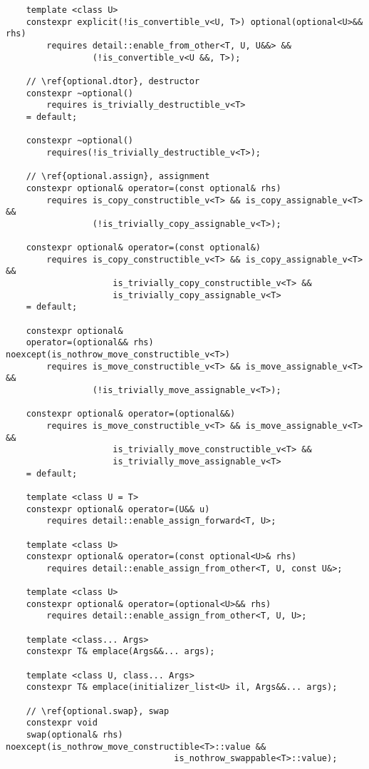 \documentclass[a4paper,10pt,oneside,openany,final,article]{memoir}
\begin{document}
\begin{verbatim}
    template <class U>
    constexpr explicit(!is_convertible_v<U, T>) optional(optional<U>&& rhs)
        requires detail::enable_from_other<T, U, U&&> &&
                 (!is_convertible_v<U &&, T>);

    // \ref{optional.dtor}, destructor
    constexpr ~optional()
        requires is_trivially_destructible_v<T>
    = default;

    constexpr ~optional()
        requires(!is_trivially_destructible_v<T>);

    // \ref{optional.assign}, assignment
    constexpr optional& operator=(const optional& rhs)
        requires is_copy_constructible_v<T> && is_copy_assignable_v<T> &&
                 (!is_trivially_copy_assignable_v<T>);

    constexpr optional& operator=(const optional&)
        requires is_copy_constructible_v<T> && is_copy_assignable_v<T> &&
                     is_trivially_copy_constructible_v<T> &&
                     is_trivially_copy_assignable_v<T>
    = default;

    constexpr optional&
    operator=(optional&& rhs) noexcept(is_nothrow_move_constructible_v<T>)
        requires is_move_constructible_v<T> && is_move_assignable_v<T> &&
                 (!is_trivially_move_assignable_v<T>);

    constexpr optional& operator=(optional&&)
        requires is_move_constructible_v<T> && is_move_assignable_v<T> &&
                     is_trivially_move_constructible_v<T> &&
                     is_trivially_move_assignable_v<T>
    = default;

    template <class U = T>
    constexpr optional& operator=(U&& u)
        requires detail::enable_assign_forward<T, U>;

    template <class U>
    constexpr optional& operator=(const optional<U>& rhs)
        requires detail::enable_assign_from_other<T, U, const U&>;

    template <class U>
    constexpr optional& operator=(optional<U>&& rhs)
        requires detail::enable_assign_from_other<T, U, U>;

    template <class... Args>
    constexpr T& emplace(Args&&... args);

    template <class U, class... Args>
    constexpr T& emplace(initializer_list<U> il, Args&&... args);

    // \ref{optional.swap}, swap
    constexpr void
    swap(optional& rhs) noexcept(is_nothrow_move_constructible<T>::value &&
                                 is_nothrow_swappable<T>::value);


\end{verbatim}
\end{document}
